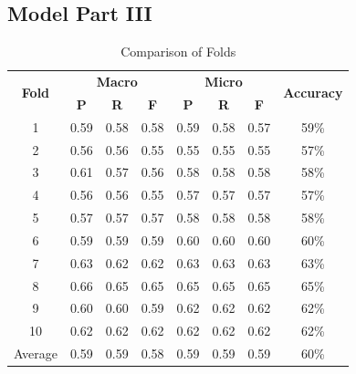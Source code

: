 \subsection*{Model Part III}
\begin{table}[h!]
  \begin{center}
      \begin{tabular}{|c|c|c|c|c|c|c|c|}
          \hline
          \multirow{2}{*}{\textbf{Fold}} & \multicolumn{3}{|c|}{\textbf{Macro}} & \multicolumn{3}{|c|}{\textbf{Micro}} &  \multirow{2}{*}{\textbf{Accuracy}}\\
          \cline{2-7}
          & \textbf{P} & \textbf{R} & \textbf{F} & \textbf{P} & \textbf{R} & \textbf{F} & \\
          \hline
          1 & 0.59 & 0.58 & 0.58 & 0.59 & 0.58 & 0.57 & 59\% \\
          \hline
          2 & 0.56 & 0.56 & 0.55 & 0.55 & 0.55 & 0.55 & 57\% \\
          \hline
          3 & 0.61 & 0.57 & 0.56 & 0.58 & 0.58 & 0.58 & 58\% \\
          \hline
          4 & 0.56 & 0.56 & 0.55 & 0.57 & 0.57 & 0.57 & 57\% \\
          \hline
          5 & 0.57 & 0.57 & 0.57 & 0.58 & 0.58 & 0.58 & 58\% \\
          \hline
          6 & 0.59 & 0.59 & 0.59 & 0.60 & 0.60 & 0.60 & 60\% \\
          \hline
          7 & 0.63 & 0.62 & 0.62 & 0.63 & 0.63 & 0.63 & 63\% \\
          \hline
          8 & 0.66 & 0.65 & 0.65 & 0.65 & 0.65 & 0.65 & 65\% \\
          \hline
          9 & 0.60 & 0.60 & 0.59 & 0.62 & 0.62 & 0.62 & 62\% \\
          \hline
          10 & 0.62 & 0.62 & 0.62 & 0.62 & 0.62 & 0.62 & 62\% \\
          \hline
          Average & 0.59 & 0.59 & 0.58 & 0.59 & 0.59 & 0.59 & 60\% \\
          \hline
      \end{tabular}
      \caption{Comparison of Folds}
      \label{tab:model-comparison}
  \end{center}
\end{table}

